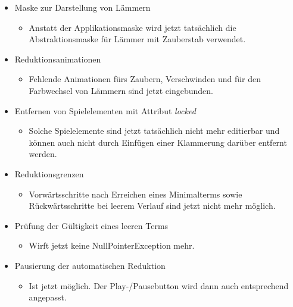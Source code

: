 \begin{itemize}
\item Maske zur Darstellung von Lämmern
\begin{itemize} 
\item Anstatt der Applikationsmaske wird jetzt tatsächlich die Abstraktionsmaske für Lämmer mit Zauberstab verwendet.
	\end{itemize}
\end{itemize}

\begin{itemize}
\item Reduktionsanimationen
\begin{itemize} 
\item Fehlende Animationen fürs Zaubern, Verschwinden und für den Farbwechsel von Lämmern sind jetzt eingebunden.
	\end{itemize}
\end{itemize}

\begin{itemize}
\item Entfernen von Spielelementen mit Attribut \textit{locked}
\begin{itemize} 
\item Solche Spielelemente sind jetzt tatsächlich nicht mehr editierbar und können auch nicht durch Einfügen einer Klammerung darüber entfernt werden.
	\end{itemize}
\end{itemize}

\begin{itemize}
\item Reduktionsgrenzen
\begin{itemize} 
\item Vorwärtsschritte nach Erreichen eines Minimalterms sowie Rückwärtsschritte bei leerem Verlauf sind jetzt nicht mehr möglich.
	\end{itemize}
\end{itemize}

\begin{itemize}
\item Prüfung der Gültigkeit eines leeren Terms
\begin{itemize} 
\item Wirft jetzt keine NullPointerException mehr.
	\end{itemize}
\end{itemize}

\begin{itemize}
\item Pausierung der automatischen Reduktion
\begin{itemize} 
\item Ist jetzt möglich. Der Play-/Pausebutton wird dann auch entsprechend angepasst.
	\end{itemize}
\end{itemize}

